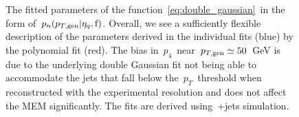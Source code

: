 \begin{figure}
\begin{centering}
 \\
 \\
\caption{The fitted parameters of the function~\cref{eq:double_gaussian}~in the form of~$p_n(p_{T,\mathrm{gen}}|\eta_{q},\mathrm{f})$. Overall, we see a sufficiently flexible description of the parameters derived in the individual fits (blue) by the polynomial fit (red). The bias in~$p_4$~near~$p_{T,\mathrm{gen}} \simeq 50$~GeV is due to the underlying double Gaussian fit not being able to accommodate the jets that fall below the~$p_T$~threshold when reconstructed with the experimental resolution and does not affect the MEM significantly. The fits are derived using~\ttbar+jets simulation.}
\label{fig:transfer_acrossbin}
\end{centering}
\end{figure}


